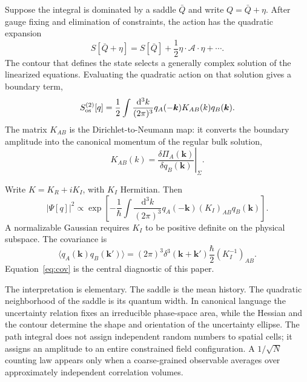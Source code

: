 \documentclass[aps,prd,twocolumn,superscriptaddress,nofootinbib,longbibliography,floatfix]{revtex4-2}
\newcommand{\dd}{\mathrm d}
\begin{document}
Suppose the integral is dominated by a saddle $\bar Q$ and write $Q=\bar Q+\eta$. After gauge fixing and elimination of constraints, the action has the quadratic expansion
\begin{equation}
S[\bar Q+\eta]=S[\bar Q]+\frac12\eta\cdot\mathcal A\cdot\eta+\cdots .
\end{equation}
The contour that defines the state selects a generally complex solution of the linearized equations. Evaluating the quadratic action on that solution gives a boundary term,
\begin{equation}
S_{\rm os}^{(2)}[q]=\frac12\int\frac{\dd^3k}{(2\pi)^3}
q_A(-\bm k)K_{AB}(k)q_B(\bm k).
\label{eq:onshell}
\end{equation}
The matrix $K_{AB}$ is the Dirichlet-to-Neumann map: it converts the boundary amplitude into the canonical momentum of the regular bulk solution,
\begin{equation}
K_{AB}(k)=\left.\frac{\delta\Pi_A(\bm k)}{\delta q_B(\bm k)}\right|_\Sigma.
\end{equation}

Write $K=K_R+iK_I$, with $K_I$ Hermitian. Then
\begin{equation}
|\Psi[q]|^2\propto
\exp\left[-\frac1\hbar\int\frac{\dd^3k}{(2\pi)^3}
q_A(-\bm k)(K_I)_{AB}q_B(\bm k)\right].
\end{equation}
A normalizable Gaussian requires $K_I$ to be positive definite on the physical subspace. The covariance is
\begin{equation}
\langle q_A(\bm k)q_B(\bm k')\rangle
=(2\pi)^3\delta^3(\bm k+\bm k')\frac\hbar2(K_I^{-1})_{AB}.
\label{eq:cov}
\end{equation}
Equation~\eqref{eq:cov} is the central diagnostic of this paper.

The interpretation is elementary. The saddle is the mean history. The quadratic neighborhood of the saddle is its quantum width. In canonical language the uncertainty relation fixes an irreducible phase-space area, while the Hessian and the contour determine the shape and orientation of the uncertainty ellipse. The path integral does not assign independent random numbers to spatial cells; it assigns an amplitude to an entire constrained field configuration. A $1/\sqrt N$ counting law appears only when a coarse-grained observable averages over approximately independent correlation volumes.
\end{document}
